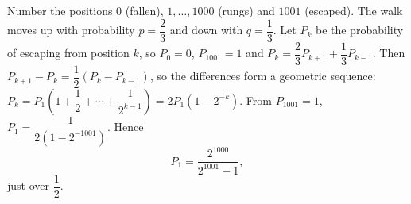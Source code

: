 Number the positions $0$ (fallen), $1,\dots,1000$ (rungs) and $1001$ (escaped). The walk moves up with probability $p=\dfrac{2}{3}$ and down with $q=\dfrac{1}{3}$. Let $P_k$ be the probability of escaping from position $k$, so $P_0=0$, $P_{1001}=1$ and $P_k=\dfrac{2}{3}P_{k+1}+\dfrac{1}{3}P_{k-1}$. Then $P_{k+1}-P_k=\dfrac{1}{2}(P_k-P_{k-1})$, so the differences form a geometric sequence: $P_k=P_1\left(1+\dfrac{1}{2}+\cdots+\dfrac{1}{2^{k-1}}\right)=2P_1\left(1-2^{-k}\right)$. From $P_{1001}=1$, $P_1=\dfrac{1}{2\left(1-2^{-1001}\right)}$. Hence
\[
P_1=\boxed{\dfrac{2^{1000}}{2^{1001}-1}},
\]
just over $\dfrac{1}{2}$.
